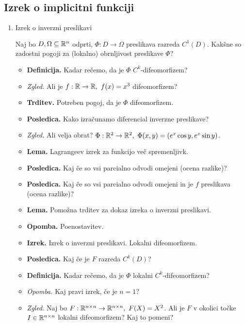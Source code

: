 \newpage
\subsection{Izrek o implicitni funkciji}
\begin{enumerate}
    \item Izrek o inverzni preslikavi
    
    Naj bo $D, \Omega \subseteq \mathbb{R}^n$ odprti, $\Phi: D \to \Omega$ preslikava razreda $C^1(D)$. Kakšne so zadostni pogoji za (lokalno) obrnljivost preslikave $\Phi$?
    
    \begin{itemize}
        \item \colorbox{purple!30}{\textbf{Definicija.}} Kadar rečemo, da je $\Phi$ $C^k$-difeomorfizem?
        \item \colorbox{yellow!30}{\emph{Zgled.}} Ali je $f: \mathbb{R} \to \mathbb{R}, \ f(x) = x^3$ difeomorfizem?        
        \item \colorbox{blue!30}{\textbf{Trditev.}} Potreben pogoj, da je $\Phi$ difeomorfizem.
        \item \colorbox{blue!30}{\textbf{Posledica.}} Kako izračunamo diferencial inverzne preslikave?

        \item \colorbox{yellow!30}{\emph{Zgled.}} Ali velja obrat? $\Phi: \R^2 \to \R^2, \ \Phi(x,y) = (e^x \cos y, e^x \sin y)$.
        \item \colorbox{blue!30}{\textbf{Lema.}} Lagrangeev izrek za funkcijo več spremenljivk.
        \item \colorbox{orange!30}{\textbf{Posledica.}} Kaj če so vsi parcialno odvodi omejeni (ocena razlike)?
        \item \colorbox{orange!30}{\textbf{Posledica.}} Kaj če so vsi parcialno odvodi omejeni in je \(f\) preslikava (ocena razlike)?
        \item \colorbox{blue!30}{\textbf{Lema.}} Pomožna trditev za dokaz izreka o inverzni preslikavi.
        \item \textbf{Opomba.} Poenostavitev.
        \item \colorbox{blue!30}{\textbf{Izrek.}} Izrek o inverzni preslikavi. Lokalni difeomorfizem. \todo{*}
        \item \colorbox{orange!30}{\textbf{Posledica.}} Kaj če je $F$ razreda $C^k(D)$?
        \item \colorbox{purple!30}{\textbf{Definicija.}} Kadar rečemo, da je $\Phi$ lokalni $C^k$-difeomorfizem?
        \item \colorbox{yellow!30}{\emph{Opomba.}} Kaj pravi izrek, če je $n = 1$?
        \item \colorbox{yellow!30}{\emph{Zgled.}}  Naj bo $F: \mathbb{R}^{n \times n} \to \mathbb{R}^{n \times n}, \ F(X) = X^2$. Ali je $F$ v okolici točke $I \in \mathbb{R}^{n \times n}$ lokalni difeomorfizem? Kaj to pomeni?
    \end{itemize}
    


\end{enumerate}
